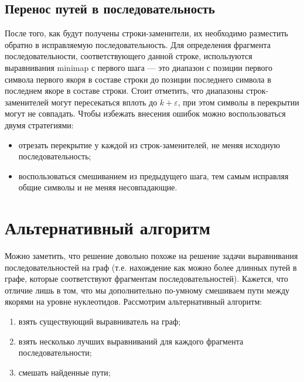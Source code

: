 \documentclass[14pt]{matmex-diploma-custom}
\begin{document}
\subsection{Перенос путей в последовательность}
После того, как будут получены строки-заменители, их необходимо разместить обратно в исправляемую последовательность. Для определения фрагмента последовательности, соответствующего данной строке, используются выравнивания minimap с первого шага --- это диапазон с позиции первого символа первого якоря в составе строки до позиции последнего символа в последнем якоре в составе строки. Стоит отметить, что диапазоны строк-заменителей могут пересекаться вплоть до $k+\varepsilon$, при этом символы в перекрытии могут не совпадать. Чтобы избежать внесения ошибок можно воспользоваться двумя стратегиями:
\begin{itemize}
    \item отрезать перекрытие у каждой из строк-заменителей, не меняя исходную последовательность;
    \item воспользоваться смешиванием из предыдущего шага, тем самым исправляя общие символы и не меняя несовпадающие.
\end{itemize}

\section{Альтернативный алгоритм}
Можно заметить, что решение довольно похоже на решение задачи выравнивания последовательностей на граф (т.е. нахождение как можно более длинных путей в графе, которые соответствуют фрагментам последовательностей). Кажется, что отличие лишь в том, что мы дополнительно по-умному смешиваем пути между якорями на уровне нуклеотидов. Рассмотрим альтернативный алгоритм:
\begin{enumerate}
    \item взять существующий выравниватель на граф;
    \item взять несколько лучших выравниваний для каждого фрагмента последовательности;
    \item смешать найденные пути;
\end{enumerate}
\end{document}
